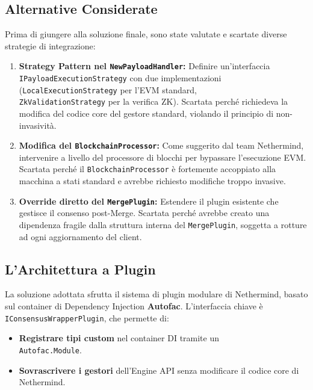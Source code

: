 \documentclass[12pt,a4paper,openright,twoside]{report}
\begin{document}
\subsection{Alternative Considerate}

Prima di giungere alla soluzione finale, sono state valutate e scartate diverse strategie di integrazione:

\begin{enumerate}
    \item \textbf{Strategy Pattern nel \texttt{NewPayloadHandler}:} Definire un'interfaccia \texttt{IPayloadExecutionStrategy} con due implementazioni \\ (\texttt{LocalExecutionStrategy} per l'EVM standard, \\\texttt{ZkValidationStrategy} per la verifica ZK). Scartata perché richiedeva la modifica del codice core del gestore standard, violando il principio di non-invasività.

    \item \textbf{Modifica del \texttt{BlockchainProcessor}:} Come suggerito dal team Nethermind, intervenire a livello del processore di blocchi per bypassare l'esecuzione EVM. Scartata perché il \texttt{BlockchainProcessor} è fortemente accoppiato alla macchina a stati standard e avrebbe richiesto modifiche troppo invasive.

    \item \textbf{Override diretto del \texttt{MergePlugin}:} Estendere il plugin esistente che gestisce il consenso post-Merge. Scartata perché avrebbe creato una dipendenza fragile dalla struttura interna del \texttt{MergePlugin}, soggetta a rotture ad ogni aggiornamento del client.
\end{enumerate}

\subsection{L'Architettura a Plugin}

La soluzione adottata sfrutta il sistema di plugin modulare di Nethermind, basato sul container di Dependency Injection \textbf{Autofac}. L'interfaccia chiave è \texttt{IConsensusWrapperPlugin}, che permette di:

\begin{itemize}
    \item \textbf{Registrare tipi custom} nel container DI tramite un\\ \texttt{Autofac.Module}.
    \item \textbf{Sovrascrivere i gestori} dell'Engine API senza modificare il codice core di Nethermind.
\end{itemize}
\end{document}
